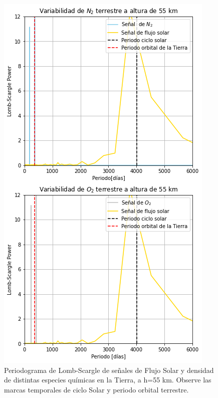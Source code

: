 \documentclass[a4paper,alpha-refs]{eSpectra}
\begin{document}
\newpage
\begin{figure}[h!]
\vspace{1mm}
	\includegraphics[width=\columnwidth, scale=1]{Imagenes/LSP_Earth55.png}
    \caption{Periodograma de Lomb-Scargle de se\~nales de Flujo Solar y densidad de distintas especies qu\'imicas en la Tierra, a h=55 km. Observe las marcas temporales de ciclo Solar y periodo orbital terrestre.}
    \label{fig:periodogramaLSP_E55}
\end{figure}
\end{document}
